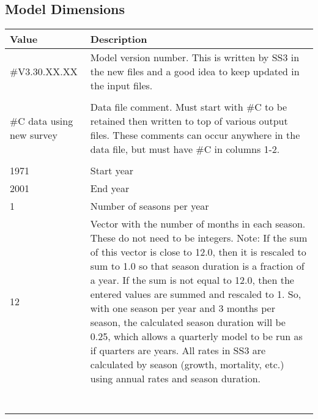 \subsection{Model Dimensions}
\begin{center}
	\begin{longtable}{p{4cm} p{12cm}}
		\hline
		\textbf{Value} & \textbf{Description} \Tstrut\Bstrut\\
		\hline
		\#V3.30.XX.XX & \multirow{1}{1cm}[-0.1cm]{\parbox{12cm}{Model version number.  This is written by SS3 in the  new files and a good idea to keep updated in the input files.}} \Tstrut\\
		&  \Bstrut\\

		\hline
		\#C data using new survey & \multirow{1}{1cm}[-0.1cm]{\parbox{12cm}{Data file comment. Must start with \#C to be retained then written to top of various output files.  These comments can occur anywhere in the data file, but must have \#C in columns 1-2.}} \Tstrut\\
		&  \Bstrut\\

		\hline
		1971 & Start year \Tstrut\Bstrut\\

		\hline
		2001 & End year \Tstrut\Bstrut\\

		\hline
		1 & Number of seasons per year \Tstrut\Bstrut\\

		\hline
		12 & \multirow{1}{1cm}[-0.1cm]{\parbox{12cm}{Vector with the number of months in each season.  These do not need to be integers.  Note:  If the sum of this vector is close to 12.0, then it is rescaled to sum to 1.0 so that season duration is a fraction of a year.  If the sum is not equal to 12.0, then the entered values are summed and rescaled to 1.  So, with one season per year and 3 months per season, the calculated season duration will be 0.25, which allows a quarterly model to be run as if quarters are years.  All rates in SS3 are  calculated by season (growth, mortality, etc.) using annual rates and season duration.}} \Tstrut\\
		& \\
		& \\
		& \\
		& \\
		& \\
		& \\
		& \Bstrut\\
		

\end{longtable}
\end{center}
